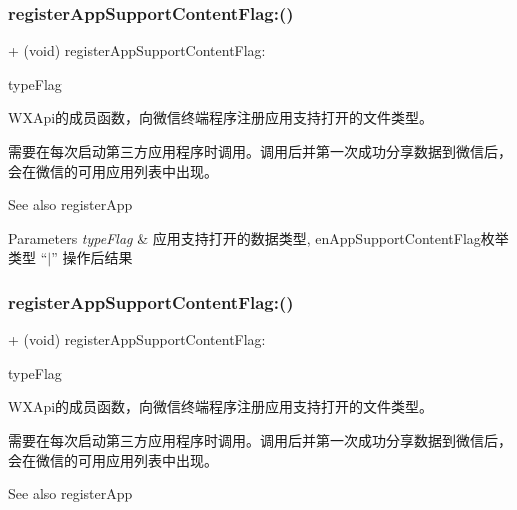 \subsubsection{\texorpdfstring{register\+App\+Support\+Content\+Flag\+:()}{registerAppSupportContentFlag:()}\hspace{0.1cm}{\footnotesize\ttfamily [2/3]}}
{\footnotesize\ttfamily + (void) register\+App\+Support\+Content\+Flag\+: \begin{DoxyParamCaption}\item[{(U\+Int64)}]{type\+Flag }\end{DoxyParamCaption}}



W\+X\+Api的成员函数，向微信终端程序注册应用支持打开的文件类型。 

需要在每次启动第三方应用程序时调用。调用后并第一次成功分享数据到微信后，会在微信的可用应用列表中出现。 \begin{DoxySeeAlso}{See also}
register\+App 
\end{DoxySeeAlso}

\begin{DoxyParams}{Parameters}
{\em type\+Flag} & 应用支持打开的数据类型, en\+App\+Support\+Content\+Flag枚举类型 “$\vert$” 操作后结果 \\
\hline
\end{DoxyParams}
\mbox{\label{interface_w_x_api_a3a8dd85dbe67ae84d4c75d674d781c9b}} 
\subsubsection{\texorpdfstring{register\+App\+Support\+Content\+Flag\+:()}{registerAppSupportContentFlag:()}\hspace{0.1cm}{\footnotesize\ttfamily [3/3]}}
{\footnotesize\ttfamily + (void) register\+App\+Support\+Content\+Flag\+: \begin{DoxyParamCaption}\item[{(U\+Int64)}]{type\+Flag }\end{DoxyParamCaption}}



W\+X\+Api的成员函数，向微信终端程序注册应用支持打开的文件类型。 

需要在每次启动第三方应用程序时调用。调用后并第一次成功分享数据到微信后，会在微信的可用应用列表中出现。 \begin{DoxySeeAlso}{See also}
register\+App 
\end{DoxySeeAlso}

